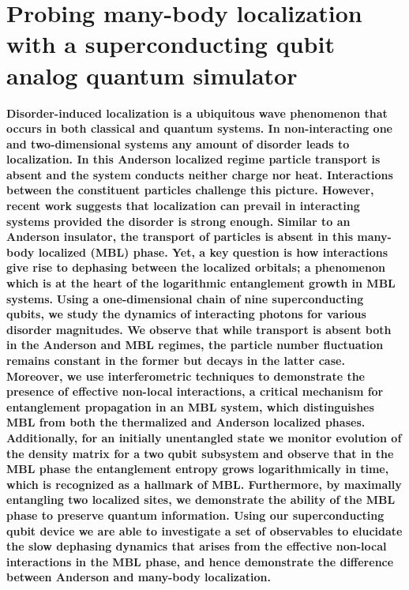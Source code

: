 
\chapter[MBL]{Probing many-body localization with a superconducting qubit analog quantum simulator}
\label{ch:MBL}

\textbf{
    Disorder-induced localization is a ubiquitous wave phenomenon that occurs in both classical and quantum systems.
    In non-interacting one and two-dimensional systems any amount of disorder leads to localization.\autocite{Anderson1958, Abrahams1979}
    In this Anderson localized regime particle transport is absent and the system conducts neither charge nor heat.
    Interactions between the constituent particles challenge this picture. However, recent work suggests that localization can prevail in interacting systems provided the disorder is strong enough.\autocite{Nandkishore2015, Altman2015,  Basko2006, Gornyi2005}
    Similar to an Anderson insulator, the transport of particles is absent in this many-body localized (MBL) phase.
    Yet, a key question is how interactions give rise to dephasing between the localized orbitals; a phenomenon which is at the heart of the logarithmic entanglement growth in MBL systems.\autocite{Bardarson2012, Serbyn2013, Huse2014}
}
\textbf{
    Using a one-dimensional chain of nine superconducting qubits\autocite{Neill2018},
    we study the dynamics of interacting photons for various disorder magnitudes. We observe that while transport is absent both in the Anderson and MBL regimes,
    the particle number fluctuation remains constant in the former but decays in the latter case. Moreover, we use interferometric techniques to demonstrate the presence of effective non-local interactions, a critical mechanism for entanglement propagation in an MBL system, which distinguishes MBL from both the thermalized and Anderson localized phases.
    Additionally, for an initially unentangled state we monitor evolution of the density matrix for a two qubit subsystem
    and observe that in the MBL phase the entanglement entropy grows logarithmically in time, which is recognized as a hallmark of MBL.
    Furthermore, by maximally entangling two localized sites, we demonstrate the ability of the MBL phase to preserve quantum information.
    Using our superconducting qubit device we are able to investigate a set of observables to elucidate the slow dephasing dynamics that arises from the effective non-local interactions in the MBL phase, and hence
    demonstrate the difference between Anderson and many-body localization.}

